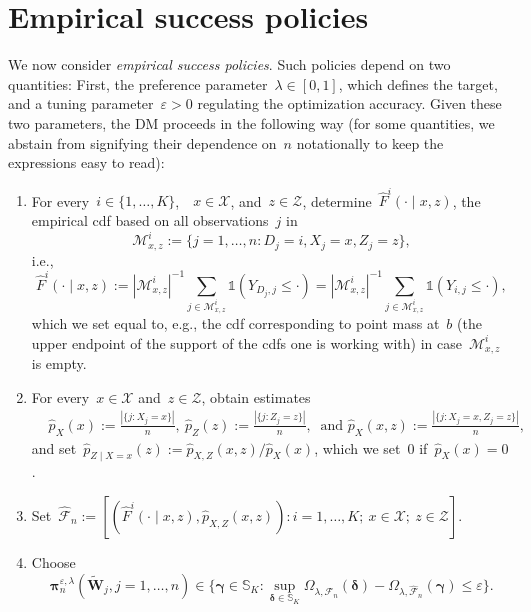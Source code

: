 \documentclass[11pt, a4paper]{article}
\theoremstyle{definition}
\begin{document}
\section{Empirical success policies}\label{sec:esr}

We now consider \emph{empirical success policies}. Such policies depend on two quantities: First, the preference parameter~$\lambda \in [0, 1]$, which defines the target, and a tuning parameter~$\varepsilon > 0$ regulating the optimization accuracy. Given these two parameters, the DM proceeds in the following way (for some quantities, we abstain from signifying their dependence on~$n$ notationally to keep the expressions easy to read):
%
\begin{enumerate}
\item For every~$i \in \{1, \hdots, K\}$,~~$x \in \mathcal{X}$, and~$z \in \mathcal{Z}$, determine~$\hat{F}^i(\cdot\mid x, z)$, the empirical cdf based on all observations~$j$ in~
\begin{equation}\label{eqn:selobs}
\mathcal{M}^i_{x, z} := \{j = 1, \hdots, n: D_j = i, X_j = x, Z_j = z\},
\end{equation}
%
i.e.,~$$\hat{F}^i(\cdot\mid x, z) := |\mathcal{M}^i_{x, z}|^{-1} \sum_{j \in \mathcal{M}^i_{x, z}}  \mathds{1}( Y_{D_j, j} \leq \cdot) = |\mathcal{M}^i_{x, z}|^{-1} \sum_{j \in \mathcal{M}^i_{x, z}}  \mathds{1}( Y_{i,j} \leq \cdot),$$ which we set equal to, e.g., the cdf corresponding to point mass at~$b$ (the upper endpoint of the support of the cdfs one is working with) in case~$\mathcal{M}^i_{x, z}$ is empty.
\item For every~$x \in \mathcal{X}$ and~$z \in \mathcal{Z}$, obtain estimates~
\begin{align*}
&\hat{p}_{X}(x) :=\frac{ |\{j: X_j = x\}|}{n},~\hat{p}_{Z}(z) :=\frac{ |\{j: Z_j = z\}|}{n},~ \text{ and }   \hat{p}_{X}(x, z) := \frac{|\{j: X_j = x, Z_j = z\}|}{n}, 
\end{align*}
and set~$\hat{p}_{Z\mid X = x}(z) := \hat{p}_{X, Z}(x, z)/\hat{p}_{X}(x)$, which we set~$0$ if~$\hat{p}_{X}(x) = 0$.
\item Set~$\hat{\mathcal{F}}_n :=  \left[(\hat{F}^i(\cdot\mid x, z), \hat{p}_{X, Z}(x, z)): i = 1, \hdots, K;~x \in \mathcal{X};~z \in \mathcal{Z}\right]$.
\item Choose
\begin{equation}\label{eqn:approxmax}
\bm{\pi}^{\varepsilon, \lambda}_n(\tilde{\bm{W}}_j, j = 1, \hdots, n) \in \bigg\{\bm{\gamma} \in \mathbb{S}_K : \sup_{\bm{\delta} \in \mathbb{S}_K} \Omega_{\lambda, \hat{\mathcal{F}}_n}(\bm{\delta}) - \Omega_{\lambda, \hat{\mathcal{F}}_n}(\bm{\gamma}) \leq \varepsilon\bigg\}.
\end{equation}
\end{enumerate}
\end{document}
